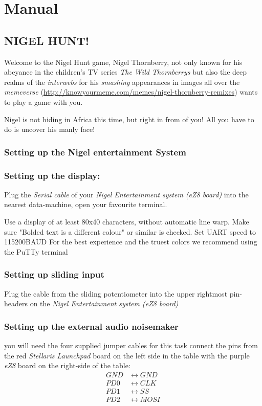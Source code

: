 \section{Manual}

\subsection{NIGEL HUNT!}
Welcome to the Nigel Hunt game,
Nigel Thornberry, not only known for his abeyance in the children's TV series
\emph{The Wild Thornberrys} but also the deep realms of the \emph{interwebs} for
his \emph{smashing} appearances in images all over the \emph{memeverse}
(\url{http://knowyourmeme.com/memes/nigel-thornberry-remixes}) wants to play a game with you.

Nigel is not hiding in Africa this time, but right in from of you! All you have
to do is uncover his manly face!

\subsubsection{Setting up the Nigel entertainment System}

\subsubsection{Setting up the display:}
Plug the \emph{Serial cable} of your \emph{Nigel Entertainment system (eZ8
board)} into the nearest data-machine, open your favourite terminal.

Use a display of at least 80x40 characters, without automatic line warp.
Make sure "Bolded text is a different colour" or similar is checked.
Set UART speed to 115200BAUD
For the best experience and the truest colors we recommend using the PuTTy terminal

\subsubsection{Setting up sliding input}
Plug the cable from the sliding potentiometer into the upper rightmost
pin-headers on the \emph{Nigel Entertainment system (eZ8
board)}

\subsubsection{Setting up the external audio noisemaker}
you will need the four supplied jumper cables for this task connect the pins
from the red \emph{Stellaris Launchpad} board on the left side in the table
with the purple \emph{eZ8} board on the right-side of the table:
\begin{align*}
GND &\leftrightarrow GND\\
PD0 &\leftrightarrow CLK\\
PD1 &\leftrightarrow SS\\
PD2 &\leftrightarrow MOSI
\end{align*}

